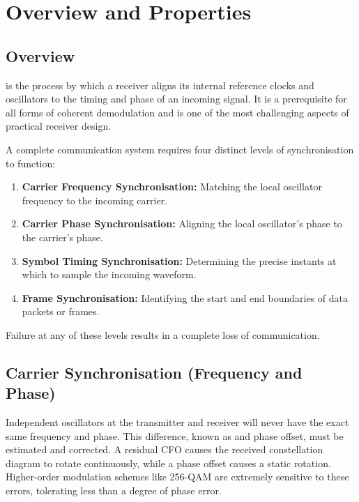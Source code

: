 \section{Overview and Properties}

\subsection{Overview}

 is the process by which a receiver aligns its internal reference clocks and oscillators to the timing and phase of an incoming signal. It is a prerequisite for all forms of coherent demodulation and is one of the most challenging aspects of practical receiver design.

\begin{keyconcept}
    A complete communication system requires four distinct levels of synchronisation to function:
    \begin{enumerate}
        \item \textbf{Carrier Frequency Synchronisation:} Matching the local oscillator frequency to the incoming carrier.
        \item \textbf{Carrier Phase Synchronisation:} Aligning the local oscillator's phase to the carrier's phase.
        \item \textbf{Symbol Timing Synchronisation:} Determining the precise instants at which to sample the incoming waveform.
        \item \textbf{Frame Synchronisation:} Identifying the start and end boundaries of data packets or frames.
    \end{enumerate}
    Failure at any of these levels results in a complete loss of communication.
\end{keyconcept}


\subsection{Carrier Synchronisation (Frequency and Phase)}

Independent oscillators at the transmitter and receiver will never have the exact same frequency and phase. This difference, known as  and phase offset, must be estimated and corrected. A residual CFO causes the received constellation diagram to rotate continuously, while a phase offset causes a static rotation. Higher-order modulation schemes like 256-QAM are extremely sensitive to these errors, tolerating less than a degree of phase error.

